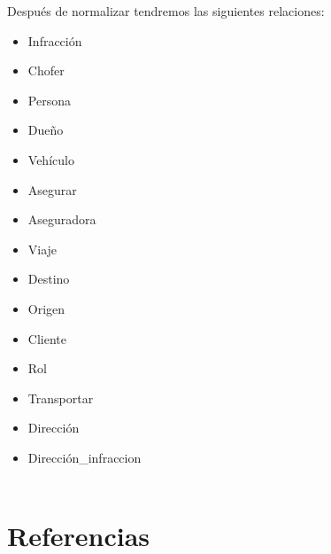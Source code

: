 \documentclass{article}
\begin{document}
Después de normalizar tendremos las siguientes relaciones:
\begin{itemize}
\item Infracción\\
\item Chofer\\
\item Persona\\
\item Dueño\\
\item Vehículo\\
\item Asegurar\\
\item Aseguradora\\
\item Viaje\\
\item Destino\\
\item Origen\\
\item Cliente\\
\item Rol\\
\item Transportar\\
\item Dirección\\
\item Dirección_infraccion\\
\\
\end{itemize}


\section{Referencias}
\end{document}
